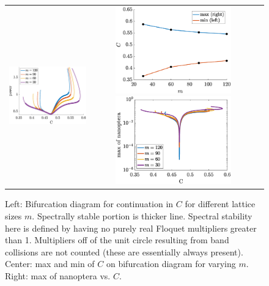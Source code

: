 \documentclass{article}
\begin{document}
\begin{figure}[H]
    \centering
    \begin{tabular}{ccc}
    \includegraphics[width=5cm]{leftBD1} &
    \includegraphics[width=5cm]{leftmaxminC} 
    \includegraphics[width=5cm]{leftBDnanop} 
    \end{tabular}
    \caption{Left: Bifurcation diagram for continuation in $C$ for different lattice sizes $m$. Spectrally stable portion is thicker line. Spectral stability here is defined by having no purely real Floquet multipliers greater than 1. Multipliers off of the unit circle resulting from band collisions are not counted (these are essentially always present). Center: max and min of $C$ on bifurcation diagram for varying $m$. 
    Right: max of nanoptera vs. $C$.}
    \label{fig:left2}
\end{figure}
\end{document}
